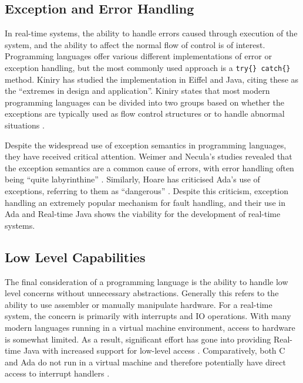 \subsection{Exception and Error Handling} %
In real-time systems, the ability to handle errors caused through execution of
the system, and the ability to affect the normal flow of control is of
interest. Programming languages offer various different implementations of
error or exception handling, but the most commonly used approach is a 
\texttt{try\{\} catch\{\} } method. Kiniry has studied the implementation in 
Eiffel and Java, citing these as the ``extremes in design and application''. 
Kiniry states that most modern programming languages can be divided into two
groups based on whether the exceptions are typically used as flow control
structures or to handle abnormal situations
\cite{Kiniry:2006:EJE:2124243.2124264}. 
\par\bigskip\noindent
Despite the widespread use of exception semantics in programming languages,
they have received critical attention. Weimer and Necula's studies revealed
that the exception semantics are a common cause of errors, with error handling
often being ``quite labyrinthine'' \cite{Weimer:2008:ESP:1330017.1330019}. 
Similarly, Hoare has criticised Ada's use of exceptions, referring to them as
``dangerous'' \cite{Hoare:1981:EOC:358549.358561}. Despite this criticism,
exception handling an extremely popular mechanism for fault handling, and their
use in Ada and Real-time Java shows the viability for the development of
real-time systems.

\subsection{Low Level Capabilities} %
The final consideration of a programming language is the ability to handle low
level concerns without unnecessary abstractions. Generally this refers to the
ability to use assembler or manually manipulate hardware. For a real-time
system, the concern is primarily with interrupts and IO operations. With many
modern languages running in a virtual machine environment, access to hardware
is somewhat limited. As a result, significant effort has gone into providing
Real-time Java with increased support for low-level access \cite{4519616,real-java}. 
Comparatively, both C and Ada do not run in a virtual machine and therefore
potentially have direct access to interrupt handlers \cite{real-time-systems}.

